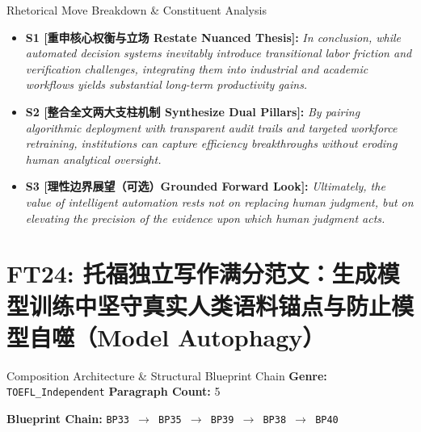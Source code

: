 \begin{TipBox}{Rhetorical Move Breakdown \& Constituent Analysis}
\begin{itemize}[leftmargin=1.5em]
  \item \textbf{S1 [重申核心权衡与立场 Restate Nuanced Thesis]:} \textit{In conclusion, while automated decision systems inevitably introduce transitional labor friction and verification challenges, integrating them into industrial and academic workflows yields substantial long-term productivity gains.}\par{}
  \item \textbf{S2 [整合全文两大支柱机制 Synthesize Dual Pillars]:} \textit{By pairing algorithmic deployment with transparent audit trails and targeted workforce retraining, institutions can capture efficiency breakthroughs without eroding human analytical oversight.}\par{}
  \item \textbf{S3 [理性边界展望（可选）Grounded Forward Look]:} \textit{Ultimately, the value of intelligent automation rests not on replacing human judgment, but on elevating the precision of the evidence upon which human judgment acts.}\par{}
\end{itemize}
\end{TipBox}
\medskip
\clearpage
\section{FT24: 托福独立写作满分范文：生成模型训练中坚守真实人类语料锚点与防止模型自噬（Model Autophagy）}\label{comp:FT24}
\begin{ConceptBox}{Composition Architecture \& Structural Blueprint Chain}
\textbf{Genre:} \texttt{TOEFL\_Independent} \quad \textbf{Paragraph Count:} 5\par
\textbf{Blueprint Chain:} \texttt{BP33 $\to$ BP35 $\to$ BP39 $\to$ BP38 $\to$ BP40}
\end{ConceptBox}
